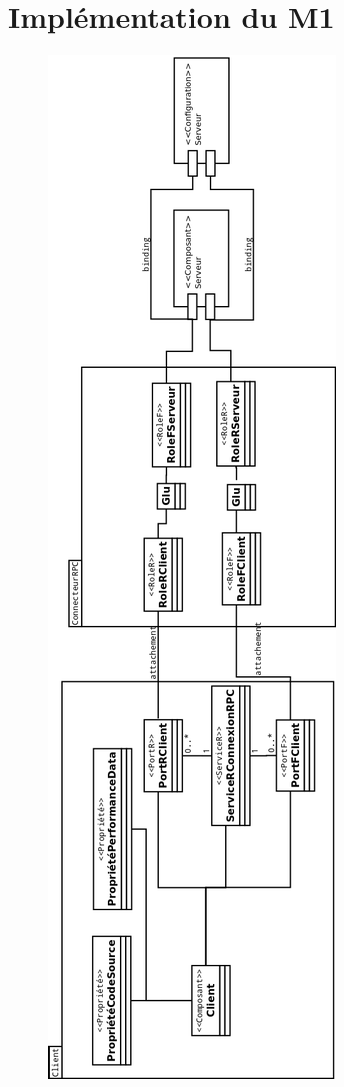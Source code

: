 \chapter{Implémentation du M1}
\pagestyle{empty}
\begin{figure}[htb]
\includegraphics[scale=0.20]{img/M11}
\end{figure}
